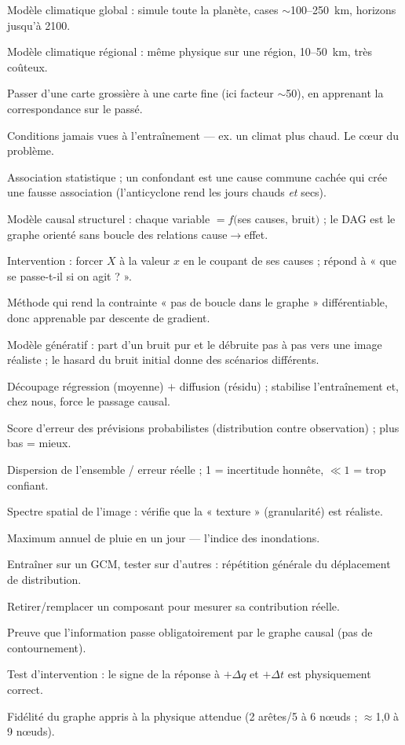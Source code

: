 \documentclass[11pt,a4paper]{article}
\begin{document}
\begin{description}[style=nextline,nosep]
  \item[GCM] Modèle climatique global : simule toute la planète, cases $\sim$100--250~km, horizons jusqu'à 2100.
  \item[RCM] Modèle climatique régional : même physique sur une région, 10--50~km, très coûteux.
  \item[Downscaling] Passer d'une carte grossière à une carte fine (ici facteur $\sim$50), en apprenant la correspondance sur le passé.
  \item[OOD (hors distribution)] Conditions jamais vues à l'entraînement --- ex. un climat plus chaud. Le c\oe ur du problème.
  \item[Corrélation / confondant] Association statistique ; un confondant est une cause commune cachée qui crée une fausse association (l'anticyclone rend les jours chauds \emph{et} secs).
  \item[SCM / DAG] Modèle causal structurel : chaque variable $=f($ses causes, bruit$)$ ; le DAG est le graphe orienté sans boucle des relations cause$\to$effet.
  \item[$\mathrm{do}(X=x)$] Intervention : forcer $X$ à la valeur $x$ en le coupant de ses causes ; répond à « que se passe-t-il si on agit ? ».
  \item[DAGMA] Méthode qui rend la contrainte « pas de boucle dans le graphe » différentiable, donc apprenable par descente de gradient.
  \item[Diffusion (EDM)] Modèle génératif : part d'un bruit pur et le débruite pas à pas vers une image réaliste ; le hasard du bruit initial donne des scénarios différents.
  \item[Two-stage] Découpage régression (moyenne) $+$ diffusion (résidu) ; stabilise l'entraînement et, chez nous, force le passage causal.
  \item[CRPS] Score d'erreur des prévisions probabilistes (distribution contre observation) ; plus bas = mieux.
  \item[Spread-skill] Dispersion de l'ensemble / erreur réelle ; 1 = incertitude honnête, $\ll 1$ = trop confiant.
  \item[RAPSD] Spectre spatial de l'image : vérifie que la « texture » (granularité) est réaliste.
  \item[RX1day] Maximum annuel de pluie en un jour --- l'indice des inondations.
  \item[Inter-GCM] Entraîner sur un GCM, tester sur d'autres : répétition générale du déplacement de distribution.
  \item[Ablation] Retirer/remplacer un composant pour mesurer sa contribution réelle.
  \item[O3 (ratio 0{,}87)] Preuve que l'information passe obligatoirement par le graphe causal (pas de contournement).
  \item[$Q_{\mathrm{int}}$ (2/2)] Test d'intervention : le signe de la réponse à $+\Delta q$ et $+\Delta t$ est physiquement correct.
  \item[$Q_{\mathrm{phys}}$ (0{,}40)] Fidélité du graphe appris à la physique attendue (2 arêtes/5 à 6 n\oe uds ; $\approx$1{,}0 à 9 n\oe uds).
\end{description}
\end{document}

